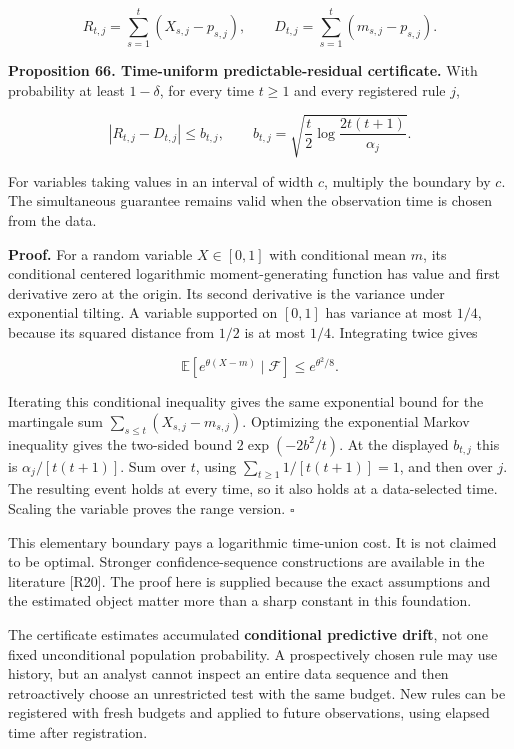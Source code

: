 \[
R_{t,j}=\sum_{s=1}^t(X_{s,j}-p_{s,j}),\qquad
D_{t,j}=\sum_{s=1}^t(m_{s,j}-p_{s,j}).
\]

\textbf{Proposition 66. Time-uniform predictable-residual certificate.}
With probability at least \(1-\delta\), for every time \(t\geq1\) and
every registered rule \(j\),

\[
\boxed{
|R_{t,j}-D_{t,j}|\leq
b_{t,j},\qquad
b_{t,j}=\sqrt{\frac t2\log\frac{2t(t+1)}{\alpha_j}}.
}
\]

For variables taking values in an interval of width \(c\), multiply the
boundary by \(c\). The simultaneous guarantee remains valid when the
observation time is chosen from the data.

\textbf{Proof.} For a random variable \(X\in[0,1]\) with conditional
mean \(m\), its conditional centered logarithmic moment-generating
function has value and first derivative zero at the origin. Its second
derivative is the variance under exponential tilting. A variable
supported on \([0,1]\) has variance at most \(1/4\), because its squared
distance from \(1/2\) is at most \(1/4\). Integrating twice gives

\[
\mathbb E[e^{\theta(X-m)}\mid\mathcal F]\leq e^{\theta^2/8}.
\]

Iterating this conditional inequality gives the same exponential bound
for the martingale sum \(\sum_{s\leq t}(X_{s,j}-m_{s,j})\). Optimizing
the exponential Markov inequality gives the two-sided bound
\(2\exp(-2b^2/t)\). At the displayed \(b_{t,j}\) this is
\(\alpha_j/[t(t+1)]\). Sum over \(t\), using
\(\sum_{t\geq1}1/[t(t+1)]=1\), and then over \(j\). The resulting event
holds at every time, so it also holds at a data-selected time. Scaling
the variable proves the range version. \(\square\)

This elementary boundary pays a logarithmic time-union cost. It is not
claimed to be optimal. Stronger confidence-sequence constructions are
available in the literature {[}R20{]}. The proof here is supplied
because the exact assumptions and the estimated object matter more than
a sharp constant in this foundation.

The certificate estimates accumulated \textbf{conditional predictive
drift}, not one fixed unconditional population probability. A
prospectively chosen rule may use history, but an analyst cannot inspect
an entire data sequence and then retroactively choose an unrestricted
test with the same budget. New rules can be registered with fresh
budgets and applied to future observations, using elapsed time after
registration.

